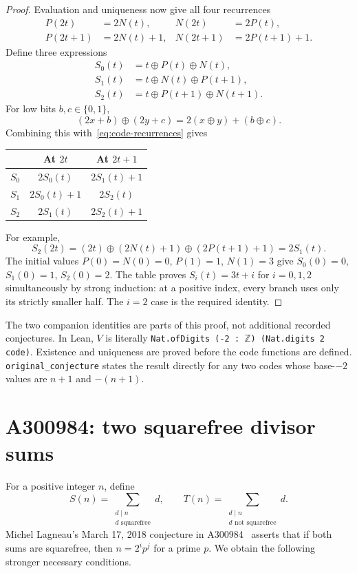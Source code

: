 \documentclass[11pt]{article}
\newcommand{\Z}{\mathbb Z}
\begin{document}
\begin{proof}
Evaluation and uniqueness now give all four recurrences
\begin{equation}\label{eq:code-recurrences}
\begin{aligned}
P(2t)&=2N(t), &N(2t)&=2P(t),\\
P(2t+1)&=2N(t)+1, &N(2t+1)&=2P(t+1)+1.
\end{aligned}
\end{equation}
Define three expressions
\[
\begin{aligned}
S_0(t)&=t\oplus P(t)\oplus N(t),\\
S_1(t)&=t\oplus N(t)\oplus P(t+1),\\
S_2(t)&=t\oplus P(t+1)\oplus N(t+1).
\end{aligned}
\]
For low bits $b,c\in\{0,1\}$,
\[
(2x+b)\oplus(2y+c)=2(x\oplus y)+(b\oplus c).
\]
Combining this with~\eqref{eq:code-recurrences} gives
\begin{center}
\begin{tabular}{@{}lcc@{}}
\toprule
 & At $2t$ & At $2t+1$\\
\midrule
$S_0$ & $2S_0(t)$ & $2S_1(t)+1$\\
$S_1$ & $2S_0(t)+1$ & $2S_2(t)$\\
$S_2$ & $2S_1(t)$ & $2S_2(t)+1$\\
\bottomrule
\end{tabular}
\end{center}
For example,
\[
S_2(2t)=(2t)\oplus(2N(t)+1)\oplus(2P(t+1)+1)=2S_1(t).
\]
The initial values $P(0)=N(0)=0$, $P(1)=1$, $N(1)=3$ give
$S_0(0)=0$, $S_1(0)=1$, $S_2(0)=2$. The table proves
$S_i(t)=3t+i$ for $i=0,1,2$ simultaneously by strong induction:
at a positive index, every branch uses only its strictly smaller half.
The $i=2$ case is the required identity.
\end{proof}

The two companion identities are parts of this proof, not additional
recorded conjectures. In Lean, $V$ is literally
\texttt{Nat.ofDigits (-2 : $\Z$) (Nat.digits 2 code)}. Existence and
uniqueness are proved before the code functions are defined.
\texttt{original\_conjecture} states the result directly for any two
codes whose base-$-2$ values are $n+1$ and $-(n+1)$.

\section{A300984: two squarefree divisor sums}

For a positive integer $n$, define
\[
 S(n)=\sum_{\substack{d\mid n\\d\text{ squarefree}}}d,
 \qquad
 T(n)=\sum_{\substack{d\mid n\\d\text{ not squarefree}}}d.
\]
Michel Lagneau's March 17, 2018 conjecture in A300984~\cite{A300984}
asserts that if both sums are squarefree, then $n=2^i p^j$ for a prime
$p$. We obtain the following stronger necessary conditions.
\end{document}
